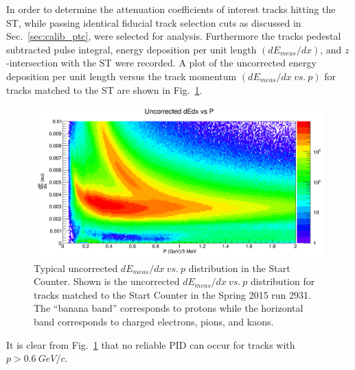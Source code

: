 {In order to determine the attenuation coefficients of interest tracks hitting the ST, while passing identical fiducial track selection cuts as discussed in Sec.~\ref{sec:calib_ptc}, were selected for analysis.  Furthermore the tracks pedestal subtracted pulse integral, energy deposition per unit length $(dE_{meas} / dx)$, and $z$-intersection with the ST were recorded.  A plot of the uncorrected energy deposition per unit length versus the track momentum $(dE_{meas} / dx\ vs.\ p)$ for tracks matched to the ST are shown in Fig.~\ref{fig:dEdx_vs_p_uncorr}.
	\begin{figure}[!htb]
		\centering
		\includegraphics[width=1.0\columnwidth]{calibration/figs/dEdx_vs_p_uncorr}
		\caption{Typical uncorrected $dE_{meas}/dx\ vs.\ p$ distribution in the Start Counter.  Shown is the uncorrected $dE_{meas}/dx\ vs.\ p$ distribution for tracks matched to the Start Counter in the Spring 2015 run 2931. The ``banana band'' corresponds to protons while the horizontal band corresponds to charged electrons, pions, and kaons.}
		\label{fig:dEdx_vs_p_uncorr}
	\end{figure}
It is clear from Fig.~\ref{fig:dEdx_vs_p_uncorr} that no reliable PID can occur for tracks with $p > 0.6\ GeV/c$.

}
